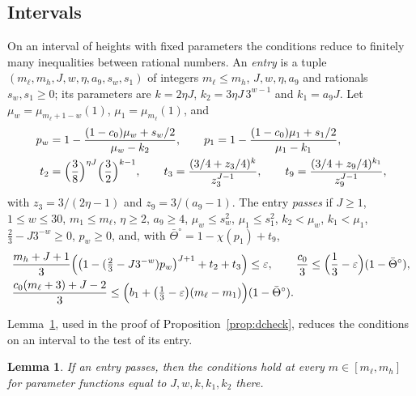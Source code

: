 \documentclass[11pt]{amsart}
\newtheorem{lemma}[theorem]{Lemma}
\theoremstyle{definition}
\numberwithin{equation}{section}
\newcommand{\lean}[1]{\ignorespaces}
\newcommand{\eps}{\varepsilon}
\begin{document}
\subsection*{Intervals}
On an interval of heights with fixed parameters the conditions reduce to finitely many inequalities between rational numbers. An \emph{entry} is a tuple $(m_\ell,m_h,J,w,\eta,a_9,s_w,s_1)$ of integers $m_\ell\le m_h$, $J,w,\eta,a_9$ and rationals $s_w,s_1\ge0$; its parameters are $k=2\eta J$, $k_2=3\eta J\,3^{w-1}$ and $k_1=a_9J$. Let $\mu_w=\mu_{m_\ell+1-w}(1)$, $\mu_1=\mu_{m_\ell}(1)$, and
\begin{align*}
p_w&=1-\frac{(1-c_0)\mu_w+s_w/2}{\mu_w-k_2},\qquad p_1=1-\frac{(1-c_0)\mu_1+s_1/2}{\mu_1-k_1},\\
t_2&=\Bigl(\frac38\Bigr)^{\eta J}\Bigl(\frac32\Bigr)^{k-1},\qquad t_3=\frac{(3/4+z_3/4)^k}{z_3^{J-1}},\qquad t_9=\frac{(3/4+z_9/4)^{k_1}}{z_9^{J-1}},
\end{align*}
with $z_3=3/(2\eta-1)$ and $z_9=3/(a_9-1)$. The entry \emph{passes} if $J\ge1$, $1\le w\le30$, $m_1\le m_\ell$, $\eta\ge2$, $a_9\ge4$, $\mu_w\le s_w^2$, $\mu_1\le s_1^2$, $k_2<\mu_w$, $k_1<\mu_1$, $\frac23-J3^{-w}\ge0$, $p_w\ge0$, and, with $\bar\Theta^\circ=1-\chi(p_1)+t_9$,
\begin{align*}
&\frac{m_h+J+1}3\Bigl(\bigl(1-(\tfrac23-J3^{-w})p_w\bigr)^{J+1}+t_2+t_3\Bigr)\le\eps,\qquad\frac{c_0}3\le\Bigl(\frac13-\eps\Bigr)(1-\bar\Theta^\circ),\\
&\frac{c_0(m_\ell+3)+J-2}3\le\Bigl(b_1+\bigl(\tfrac13-\eps\bigr)(m_\ell-m_1)\Bigr)(1-\bar\Theta^\circ).
\end{align*}

Lemma~\ref{lem:interval}, used in the proof of Proposition~\ref{prop:dcheck}, reduces the conditions on an interval to the test of its entry.

\begin{lemma}\label{lem:interval}\lean{FrogModel.D3.LaneE.Entry.sound, FrogModel.D3.LaneE.Entry.check}
If an entry passes, then the conditions hold at every $m\in[m_\ell,m_h]$ for parameter functions equal to $J,w,k,k_1,k_2$ there.
\end{lemma}
\end{document}
